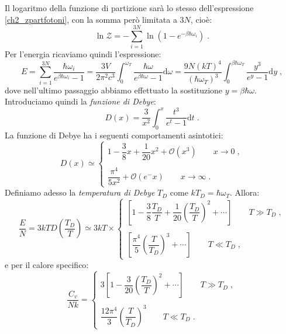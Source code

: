 \documentclass[10pt,a4paper]{report}
\theoremstyle{definition}
\numberwithin{equation}{section}
\newcommand{\diff}[1][]{\mathrm{d}#1}
\newcommand{\zpart}{\mathcal{Z}}
\begin{document}
Il logaritmo della funzione di partizione sarà lo stesso dell'espressione \eqref{ch2_zpartfotoni}, con la somma però limitata a $3N$, cioè:
\begin{equation}
\ln\zpart=-\sum_{i=1}^{3N}\ln(1-e^{-\beta\hbar\omega_i})\;.
\end{equation}
Per l'energia ricaviamo quindi l'espressione:
$$
E=\sum_{i=1}^{3N}\frac{\hbar\omega_i}{e^{\beta\hbar\omega_i}-1}=\frac{3V}{2\pi^2c^3}\int_0^{\omega_T}\frac{\hbar\omega}{e^{\beta\hbar\omega}-1}\diff{\omega}=\frac{9N(kT)^4}{(\hbar\omega_T)^3}\int_0^{\beta\hbar\omega_T}\frac{y^3}{e^y-1}\diff{y}\;,
$$
dove nell'ultimo passaggio abbiamo effettuato la sostituzione $y=\beta\hbar\omega$. Introduciamo quindi la \emph{funzione di Debye}:
\begin{equation}
D(x)=\frac{3}{x^2}\int_0^x\frac{t^3}{e^t-1}\diff{t}\;.
\end{equation}
La funzione di Debye ha i seguenti comportamenti asintotici:
\begin{equation}
D(x)\simeq\begin{cases}
1-\dfrac{3}{8}x+\dfrac{1}{20}x^2+\mathcal{O}(x^3)\qquad x\to 0\;, \\
\\
\dfrac{\pi^4}{5x^2}+\mathcal{O}(e^-x)\qquad x\to\infty\;.
\end{cases}
\end{equation}
Definiamo adesso la \emph{temperatura di Debye} $T_D$ come $kT_D=\hbar\omega_T$. Allora:
\begin{equation}
\frac{E}{N}=3kTD\left(\frac{T_D}{T}\right)\simeq 3kT\times \begin{cases}
\left[1-\dfrac{3}{8}\dfrac{T_D}{T}+\dfrac{1}{20}\left(\dfrac{T_D}{T}\right)^2+\cdots\right]\qquad T\gg T_D\;, \\
\\
\left[\dfrac{\pi^4}{5}\left(\dfrac{T}{T_D}\right)^3+\cdots\right]\qquad T\ll T_D\;,
\end{cases}
\end{equation}
e per il calore specifico:
\begin{equation}
\frac{C_v}{Nk}=\begin{cases}
3\left[1-\dfrac{3}{20}\left(\dfrac{T_D}{T}\right)^2+\cdots\right]\qquad T\gg T_D\;, \\
\\
\dfrac{12\pi^4}{3}\left(\dfrac{T}{T_D}\right)^3\qquad T\ll T_D\;.
\end{cases}
\end{equation}
\end{document}
